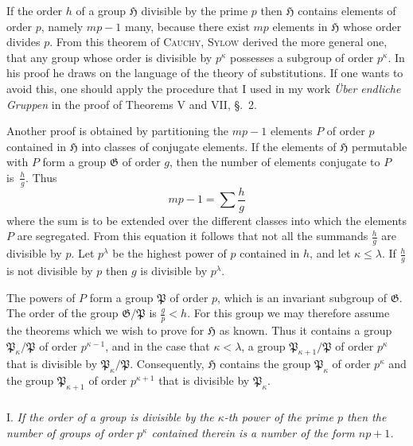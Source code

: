 \documentclass[a5paper,12pt]{article}
\newcommand{\secformat}[1]{\centering{\normalfont\normalsize{#1}}}
\let\fr\mathfrak
\newcommand{\CG}{\fr{G}}
\newcommand{\CH}{\fr{H}}
\newcommand{\CP}{\fr{P}}
\newcommand{\?}{{\color{blue}${}^{(?)}$}}
\newcounter{origpagecounter}{}
\newcommand{\origpagebreak}{\mark{\arabic{origpagecounter}}\addtocounter{origpagecounter}{1}\mark{\arabic{origpagecounter}}}
\begin{document}
If the order $h$ of a group $\CH$ divisible by the prime $p$
then
$\CH$ contains elements of order $p$,
namely $m p - 1$ many,
because there exist $m p$ elements in $\CH$
whose order divides $p$.
%
%
From this theorem of \textsc{Cauchy},
\textsc{Sylow}
derived the more general one,
that
any group whose order is divisible by $p^\kappa$
possesses
a subgroup of order $p^\kappa$.
%
%
In his proof he draws on
the language of the theory of substitutions.
%
%
If one wants to avoid this,
one should apply the procedure
that I used
in my work
\emph{\"Uber endliche Gruppen}
in the proof of
Theorems V and VII, \S.~2.


Another proof is obtained
by partitioning
the $m p - 1$ elements $P$ of order $p$ contained in $\CH$
into classes of conjugate elements.
%
%
If the elements of $\CH$ permutable with $P$
form a group $\CG$ of order $g$,
then
the number of elements conjugate to $P$ is~$\frac{h}{g}$.
%
%
Thus
\[
	m p - 1
	=
	\sum \frac{h}{g}
\]
where the sum is to be extended
over the different classes
into which the elements $P$ are segregated.
%
%
From this equation it follows
that
not all the summands $\frac{h}{g}$
are divisible by $p$.
%
%
Let $p^\lambda$ be the highest power of $p$ contained in $h$,
and
let $\kappa \leq \lambda$.
%
%
If $\frac{h}{g}$ is not divisible by $p$
then $g$ is divisible by $p^\lambda$.
%
%
\origpagebreak
%
%
The powers of $P$ form a group $\CP$ of order $p$,
which is an invariant subgroup of $\CG$.
%
%
The order of the group $\CG / \CP$ is $\frac{g}{p} < h$.
%
%
For this group we may therefore
assume the theorems
which we wish to prove for $\CH$ as known.
%
%
Thus it contains
a group $\CP_\kappa / \CP$
of order $p^{\kappa - 1}$,
and in the case that $\kappa < \lambda$,
a group $\CP_{\kappa+1} / \CP$ of order $p^\kappa$
that is divisible by $\CP_\kappa / \CP$.
%
%
Consequently,
$\CH$ contains the group $\CP_\kappa$ of order $p^\kappa$
and the group $\CP_{\kappa+1}$ of order $p^{\kappa+1}$
that is divisible by $\CP_\kappa$.


\subsubsection*{\secformat{\S.~4.}}

I.
%
\label{t:4-1}
%
\emph{ %
If the order of a group is divisible by
the $\kappa$-th power of the prime $p$
then
the number of groups of order $p^\kappa$
contained therein
is a number of the form $n p + 1$.
}
\end{document}
